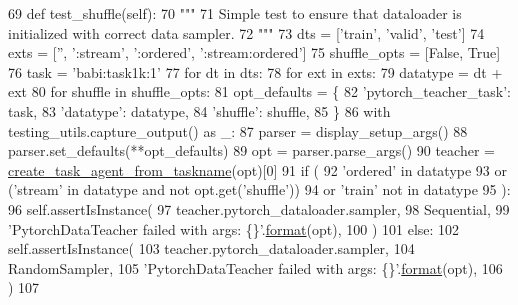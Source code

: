 \begin{DoxyCode}
69     \textcolor{keyword}{def }test\_shuffle(self):
70         \textcolor{stringliteral}{"""}
71 \textcolor{stringliteral}{        Simple test to ensure that dataloader is initialized with correct data sampler.}
72 \textcolor{stringliteral}{        """}
73         dts = [\textcolor{stringliteral}{'train'}, \textcolor{stringliteral}{'valid'}, \textcolor{stringliteral}{'test'}]
74         exts = [\textcolor{stringliteral}{''}, \textcolor{stringliteral}{':stream'}, \textcolor{stringliteral}{':ordered'}, \textcolor{stringliteral}{':stream:ordered'}]
75         shuffle\_opts = [\textcolor{keyword}{False}, \textcolor{keyword}{True}]
76         task = \textcolor{stringliteral}{'babi:task1k:1'}
77         \textcolor{keywordflow}{for} dt \textcolor{keywordflow}{in} dts:
78             \textcolor{keywordflow}{for} ext \textcolor{keywordflow}{in} exts:
79                 datatype = dt + ext
80                 \textcolor{keywordflow}{for} shuffle \textcolor{keywordflow}{in} shuffle\_opts:
81                     opt\_defaults = \{
82                         \textcolor{stringliteral}{'pytorch\_teacher\_task'}: task,
83                         \textcolor{stringliteral}{'datatype'}: datatype,
84                         \textcolor{stringliteral}{'shuffle'}: shuffle,
85                     \}
86                     with testing\_utils.capture\_output() \textcolor{keyword}{as} \_:
87                         parser = display\_setup\_args()
88                         parser.set\_defaults(**opt\_defaults)
89                         opt = parser.parse\_args()
90                         teacher = \hyperlink{namespaceparlai_1_1core_1_1agents_a76269fb567532a8fb7f29edcc20a6e47}{create\_task\_agent\_from\_taskname}(opt)[0]
91                         \textcolor{keywordflow}{if} (
92                             \textcolor{stringliteral}{'ordered'} \textcolor{keywordflow}{in} datatype
93                             \textcolor{keywordflow}{or} (\textcolor{stringliteral}{'stream'} \textcolor{keywordflow}{in} datatype \textcolor{keywordflow}{and} \textcolor{keywordflow}{not} opt.get(\textcolor{stringliteral}{'shuffle'}))
94                             \textcolor{keywordflow}{or} \textcolor{stringliteral}{'train'} \textcolor{keywordflow}{not} \textcolor{keywordflow}{in} datatype
95                         ):
96                             self.assertIsInstance(
97                                 teacher.pytorch\_dataloader.sampler,
98                                 Sequential,
99                                 \textcolor{stringliteral}{'PytorchDataTeacher failed with args: \{\}'}.\hyperlink{namespaceparlai_1_1chat__service_1_1services_1_1messenger_1_1shared__utils_a32e2e2022b824fbaf80c747160b52a76}{format}(opt),
100                             )
101                         \textcolor{keywordflow}{else}:
102                             self.assertIsInstance(
103                                 teacher.pytorch\_dataloader.sampler,
104                                 RandomSampler,
105                                 \textcolor{stringliteral}{'PytorchDataTeacher failed with args: \{\}'}.\hyperlink{namespaceparlai_1_1chat__service_1_1services_1_1messenger_1_1shared__utils_a32e2e2022b824fbaf80c747160b52a76}{format}(opt),
106                             )
107 
\end{DoxyCode}
